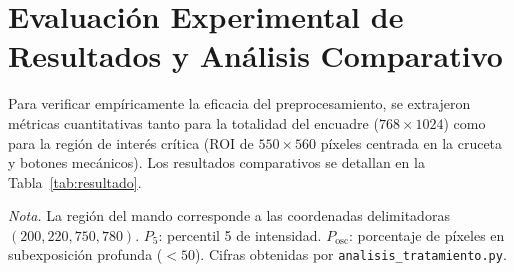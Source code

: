\documentclass[12pt,letterpaper]{article}
\newcommand{\nota}[1]{\par\noindent\small\textit{Nota.} #1\par\normalsize}
\begin{document}
\section{Evaluaci\'on Experimental de Resultados y An\'alisis Comparativo}
Para verificar emp\'iricamente la eficacia del preprocesamiento, se extrajeron m\'etricas cuantitativas tanto para la totalidad del encuadre ($768\times1024$) como para la regi\'on de inter\'es cr\'itica (ROI de $550\times560$ p\'ixeles centrada en la cruceta y botones mec\'anicos). Los resultados comparativos se detallan en la Tabla~\ref{tab:resultado}.

\begin{table}[H]
\caption{Comparaci\'on cuantitativa de la fotograf\'ia con sombra antes y despu\'es de CLAHE}\label{tab:resultado}
\begin{singlespace}
\centering
{}
\end{singlespace}
\nota{La regi\'on del mando corresponde a las coordenadas delimitadoras $(200, 220, 750, 780)$. $P_5$: percentil 5 de intensidad. $P_{\text{osc}}$: porcentaje de p\'ixeles en subexposici\'on profunda ($< 50$). Cifras obtenidas por \texttt{analisis\_tratamiento.py}.}
\end{table}
\end{document}
